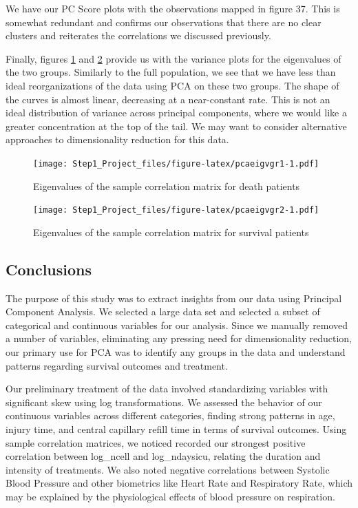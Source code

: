 \documentclass[
]{article}
\begin{document}
We have our PC Score plots with the observations mapped in figure 37.
This is somewhat redundant and confirms our observations that there are
no clear clusters and reiterates the correlations we discussed
previously.

Finally, figures \ref{fig:pcaeigvgr1} and \ref{fig:pcaeigvgr2} provide
us with the variance plots for the eigenvalues of the two groups.
Similarly to the full population, we see that we have less than ideal
reorganizations of the data using PCA on these two groups. The shape of
the curves is almost linear, decreasing at a near-constant rate. This is
not an ideal distribution of variance across principal components, where
we would like a greater concentration at the top of the tail. We may
want to consider alternative approaches to dimensionality reduction for
this data.

\begin{figure}
\centering
\texttt{[image: Step1\_Project\_files/figure-latex/pcaeigvgr1-1.pdf]}
\caption{Eigenvalues of the sample correlation matrix for death
patients\label{fig:pcaeigvgr1}}
\end{figure}

\begin{figure}
\centering
\texttt{[image: Step1\_Project\_files/figure-latex/pcaeigvgr2-1.pdf]}
\caption{Eigenvalues of the sample correlation matrix for survival
patients\label{fig:pcaeigvgr2}}
\end{figure}

\newpage

\hypertarget{conclusions}{%
\subsection{Conclusions}\label{conclusions}}

The purpose of this study was to extract insights from our data using
Principal Component Analysis. We selected a large data set and selected
a subset of categorical and continuous variables for our analysis. Since
we manually removed a number of variables, eliminating any pressing need
for dimensionality reduction, our primary use for PCA was to identify
any groups in the data and understand patterns regarding survival
outcomes and treatment.

Our preliminary treatment of the data involved standardizing variables
with significant skew using log transformations. We assessed the
behavior of our continuous variables across different categories,
finding strong patterns in age, injury time, and central capillary
refill time in terms of survival outcomes. Using sample correlation
matrices, we noticed recorded our strongest positive correlation between
log\_ncell and log\_ndaysicu, relating the duration and intensity of
treatments. We also noted negative correlations between Systolic Blood
Pressure and other biometrics like Heart Rate and Respiratory Rate,
which may be explained by the physiological effects of blood pressure on
respiration.
\end{document}
